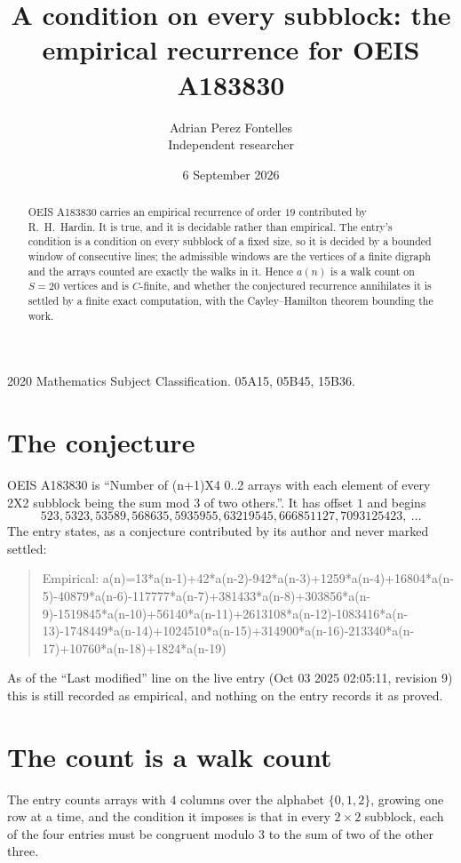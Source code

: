 \documentclass[11pt,a4paper]{article}
\title{A condition on every subblock: the empirical recurrence for OEIS A183830}
\author{Adrian Perez Fontelles\\ \small Independent researcher}
\date{6 September 2026}
\theoremstyle{plain}
\theoremstyle{definition}
\begin{document}
\maketitle

\begin{abstract}
OEIS A183830 carries an empirical recurrence of order $19$ contributed by R.~H.~Hardin. It is
true, and it is decidable rather than empirical. The entry's condition is a condition on every
subblock of a fixed size, so it is decided by a bounded window of consecutive lines; the
admissible windows are the vertices of a finite digraph and the arrays counted are exactly the
walks in it. Hence $a(n)$ is a walk count on $S=20$ vertices and is $C$-finite, and whether the
conjectured recurrence annihilates it is settled by a finite exact computation, with the
Cayley--Hamilton theorem bounding the work.
\end{abstract}

\noindent\small 2020 Mathematics Subject Classification. 05A15, 05B45, 15B36.\normalsize

\section{The conjecture}

OEIS A183830 is ``Number of (n+1)X4 0..2 arrays with each element of every 2X2 subblock being the sum mod 3 of two others.''. It has offset $1$ and begins
\[
523, 5323, 53589, 568635, 5935955, 63219545, 666851127, 7093125423,\ \dots
\]
The entry states, as a conjecture contributed by its author and never marked settled:
\begin{quote}
Empirical: a(n)=13*a(n-1)+42*a(n-2)-942*a(n-3)+1259*a(n-4)+16804*a(n-5)-40879*a(n-6)-117777*a(n-7)+381433*a(n-8)+303856*a(n-9)-1519845*a(n-10)+56140*a(n-11)+2613108*a(n-12)-1083416*a(n-13)-1748449*a(n-14)+1024510*a(n-15)+314900*a(n-16)-213340*a(n-17)+10760*a(n-18)+1824*a(n-19)
\end{quote}
As of the ``Last modified'' line on the live entry (Oct 03 2025 02:05:11, revision 9) this is still
recorded as empirical, and nothing on the entry records it as proved.

\section{The count is a walk count}

The entry counts arrays with $4$ columns over the alphabet $\{0,1,2\}$, growing one row at a time, and the condition it imposes is that in every $2\times2$ subblock, each of the four entries must be congruent modulo $3$ to the sum of two of the other three.
\end{document}
